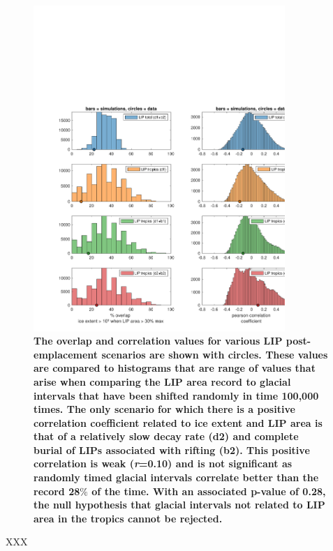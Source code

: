 \documentclass[11pt,letterpaper]{article}
\begin{document}
\begin{figure}[h!]
\begin{center}
	\includegraphics[width=0.85\textwidth]{Manuscript/Figures/overlap_correlation.pdf}
	\caption{\textbf{The overlap and correlation values for various LIP post-emplacement scenarios are shown with circles. These values are compared to histograms that are range of values that arise when comparing the LIP area record to glacial intervals that have been shifted randomly in time 100,000 times. The only scenario for which there is a positive correlation coefficient related to ice extent and LIP area is that of a relatively slow decay rate (d2) and complete burial of LIPs associated with rifting (b2). This positive correlation is weak (\textit{r}=0.10) and is not significant as randomly timed glacial intervals correlate better than the record 28$\%$ of the time. With an associated p-value of 0.28, the null hypothesis that glacial intervals not related to LIP area in the tropics cannot be rejected.}}
	\label{fig:LIP_correlation}
\end{center}
\end{figure}




\newpage
\footnotesize

XXX

\singlespacing



\end{document}
